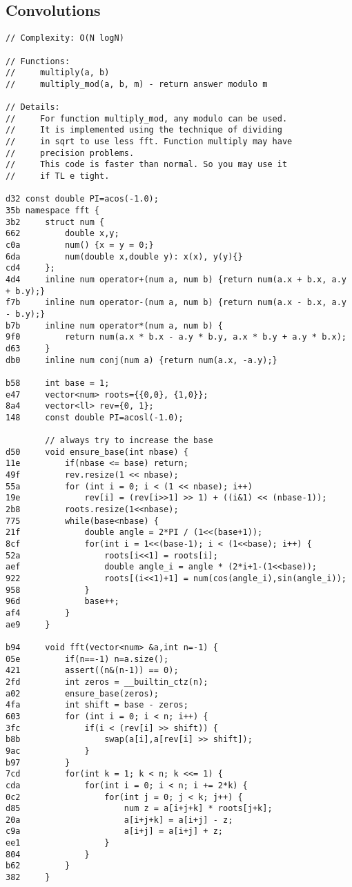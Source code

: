 \documentclass[11pt, a4paper, twoside]{article}
\begin{document}
\subsection{Convolutions}
\begin{lstlisting}
// Complexity: O(N logN)

// Functions:
//     multiply(a, b)
//     multiply_mod(a, b, m) - return answer modulo m

// Details:
//     For function multiply_mod, any modulo can be used. 
//     It is implemented using the technique of dividing 
//     in sqrt to use less fft. Function multiply may have
//     precision problems.
//     This code is faster than normal. So you may use it
//     if TL e tight.

d32 const double PI=acos(-1.0);
35b namespace fft {
3b2     struct num {
662         double x,y;
c0a         num() {x = y = 0;}
6da         num(double x,double y): x(x), y(y){}
cd4     };
4d4     inline num operator+(num a, num b) {return num(a.x + b.x, a.y + b.y);}
f7b     inline num operator-(num a, num b) {return num(a.x - b.x, a.y - b.y);}
b7b     inline num operator*(num a, num b) {
9f0         return num(a.x * b.x - a.y * b.y, a.x * b.y + a.y * b.x);
d63     }
db0     inline num conj(num a) {return num(a.x, -a.y);}
     
b58     int base = 1;
e47     vector<num> roots={{0,0}, {1,0}};
8a4     vector<ll> rev={0, 1};
148     const double PI=acosl(-1.0);
     
        // always try to increase the base
d50     void ensure_base(int nbase) {
11e         if(nbase <= base) return;
49f         rev.resize(1 << nbase);
55a         for (int i = 0; i < (1 << nbase); i++)
19e             rev[i] = (rev[i>>1] >> 1) + ((i&1) << (nbase-1));
2b8         roots.resize(1<<nbase);
775         while(base<nbase) {
21f             double angle = 2*PI / (1<<(base+1));
8cf             for(int i = 1<<(base-1); i < (1<<base); i++) {
52a                 roots[i<<1] = roots[i];
aef                 double angle_i = angle * (2*i+1-(1<<base));
922                 roots[(i<<1)+1] = num(cos(angle_i),sin(angle_i));
958             }
96d             base++;
af4         }
ae9     }
     
b94     void fft(vector<num> &a,int n=-1) {
05e         if(n==-1) n=a.size();
421         assert((n&(n-1)) == 0);
2fd         int zeros = __builtin_ctz(n);
a02         ensure_base(zeros);
4fa         int shift = base - zeros;
603         for (int i = 0; i < n; i++) {
3fc             if(i < (rev[i] >> shift)) {
b8b                 swap(a[i],a[rev[i] >> shift]);
9ac             }
b97         }
7cd         for(int k = 1; k < n; k <<= 1) {
cda             for(int i = 0; i < n; i += 2*k) {
0c2                 for(int j = 0; j < k; j++) {
d85                     num z = a[i+j+k] * roots[j+k];
20a                     a[i+j+k] = a[i+j] - z;
c9a                     a[i+j] = a[i+j] + z;
ee1                 }
804             }
b62         }
382     }
     

\end{lstlisting}
\end{document}
